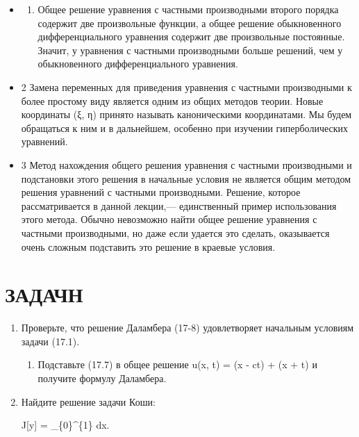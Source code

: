 \documentclass[
  ukrainian,
]{article}
\providecommand{\tightlist}{%
  \setlength{\itemsep}{0pt}\setlength{\parskip}{0pt}}
\begin{document}
\begin{itemize}
\item
  \begin{enumerate}
  \def\labelenumi{\arabic{enumi}.}
  \tightlist
  \item
    Общее решение уравнения с частными производными второго порядка
    содержит две произвольные функции, а общее решение обыкновенного
    дифференциального уравнения содержит две произвольные постоянные.
    Значит, у уравнения с частными производными больше решений, чем у
    обыкновенного дифференциального уравнения.
  \end{enumerate}
\item
  2 Замена переменных для приведения уравнения с частными производными к
  более простому виду является одним из общих методов теории. Новые
  координаты (ξ, η) принято называть каноническими координатами. Мы
  будем обращаться к ним и в дальнейшем, особенно при изучении
  гиперболических уравнений.
\item
  3 Метод нахождения общего решения уравнения с частными производными и
  подстановки этого решения в начальные условия не является общим
  методом решения уравнений с частными производными. Решение, которое
  рассматривается в данной лекции,--- единственный пример использования
  этого метода. Обычно невозможно найти общее решение уравнения с
  частными производными, но даже если удается это сделать, оказывается
  очень сложным подставить это решение в краевые условия.
\end{itemize}

\section{ЗАДАЧН}\label{ux437ux430ux434ux430ux447ux43d}

\begin{enumerate}
\def\labelenumi{\arabic{enumi}.}
\item
  Проверьте, что решение Даламбера (17-8) удовлетворяет начальным
  условиям задачи (17.1).

  \begin{enumerate}
  \def\labelenumii{\arabic{enumii}.}
  \setcounter{enumii}{1}
  \tightlist
  \item
    Подставьте (17.7) в общее решение u(x, t) = \psi(x - ct) + \psi(x +
    \epsilon t) и получите формулу Даламбера.
  \end{enumerate}
\item
  Найдите решение задачи Коши:

  J{[}y{]} = \int\_\{0\}\^{}\{1\}  dx.
\end{enumerate}
\end{document}
